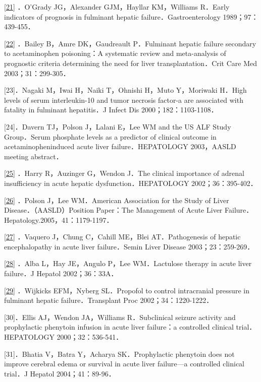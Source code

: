 \protect\hyperlink{text00019.htmlux5cux23ch21-18-back}{{[}21{]}}
．O'Grady JG，Alexander GJM，Hayllar KM，Williams R．Early indicators of
prognosis in fulminant hepatic failure．Gastroenterology
1989；97：439-455．

\protect\hyperlink{text00019.htmlux5cux23ch22-18-back}{{[}22{]}}
．Bailey B，Amre DK，Gaudreault P．Fulminant hepatic failure secondary
to acetaminophen poisoning：A systematic review and meta-analysis of
prognostic criteria determining the need for liver transplantation．Crit
Care Med 2003；31：299-305．

{[}23{]}．Nagaki M，Iwai H，Naiki T，Ohnishi H，Muto Y，Moriwaki H．High
levels of serum interleukin-10 and tumor necrosis factor-a are
associated with fatality in fulminant hepatitis．J Infect Dis
2000；182：1103-1108．

{[}24{]}．Davern TJ，Polson J，Lalani E，Lee WM and the US ALF Study
Group．Serum phosphate levels as a predictor of clinical outcome in
acetaminopheninduced acute liver failure．HEPATOLOGY 2003，AASLD meeting
abstract．

\protect\hyperlink{text00019.htmlux5cux23ch25-18-back}{{[}25{]}} ．Harry
R，Auzinger G，Wendon J．The clinical importance of adrenal
insufficiency in acute hepatic dysfunction．HEPATOLOGY
2002；36：395-402．

\protect\hyperlink{text00019.htmlux5cux23ch26-18-back}{{[}26{]}}
．Polson J，Lee WM．American Association for the Study of Liver
Disease．（AASLD）Position Paper：The Management of Acute Liver
Failure．Hepatology.2005，41：1179-1197．

\protect\hyperlink{text00019.htmlux5cux23ch27-18-back}{{[}27{]}}
．Vaquero J，Chung C，Cahill ME，Blei AT．Pathogenesis of hepatic
encephalopathy in acute liver failure．Semin Liver Disease
2003；23：259-269．

\protect\hyperlink{text00019.htmlux5cux23ch28-18-back}{{[}28{]}} ．Alba
L，Hay JE，Angulo P，Lee WM．Lactulose therapy in acute liver failure．J
Hepatol 2002；36：33A．

\protect\hyperlink{text00019.htmlux5cux23ch29-18-back}{{[}29{]}}
．Wijkicks EFM，Nyberg SL．Propofol to control intracranial pressure in
fulminant hepatic failure．Transplant Proc 2002；34：1220-1222．

{[}30{]}．Ellis AJ，Wendon JA，Williams R．Subclinical seizure activity
and prophylactic phenytoin infusion in acute liver failure：a controlled
clinical trial．HEPATOLOGY 2000；32：536-541．

{[}31{]}．Bhatia V，Batra Y，Acharya SK．Prophylactic phenytoin does not
improve cerebral edema or survival in acute liver failure---a controlled
clinical trial．J Hepatol 2004；41：89-96．

